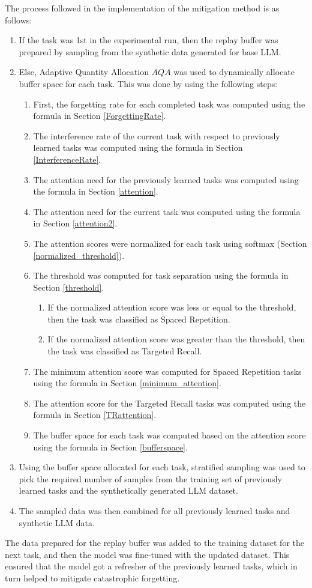 The process followed in the implementation of the mitigation method is as follows:
\begin{enumerate}
\item If the task was 1st in the experimental run, then the replay buffer was prepared by sampling from the synthetic data generated for base LLM.
\item Else, Adaptive Quantity Allocation \(AQA\) was used to dynamically allocate buffer space for each task. This was done by using the following steps:
\begin{enumerate} [label*=\arabic*.]
\item First, the forgetting rate for each completed task was computed using the formula in Section \ref{ForgettingRate}.
\item The interference rate of the current task with respect to previously learned tasks was computed using the formula in Section \ref{InterferenceRate}.
\item The attention need for the previously learned tasks was computed using the formula in Section \ref{attention}.
\item The attention need for the current task was computed using the formula in Section \ref{attention2}.
\item The attention scores were normalized for each task using softmax (Section \ref{normalized_threshold}).
\item The threshold was computed for task separation using the formula in Section \ref{threshold}.
\begin{enumerate} [label*=\roman*.]
\item If the normalized attention score was less or equal to the threshold, then the task was classified as Spaced Repetition.
\item If the normalized attention score was greater than the threshold, then the task was classified as Targeted Recall.
\end{enumerate}
\item The minimum attention score was computed for Spaced Repetition tasks using the formula in Section \ref{minimum_attention}.
\item The attention score for the Targeted Recall tasks was computed using the formula in Section \ref{TRattention}.
\item The buffer space for each task was computed based on the attention score using the formula in Section \ref{bufferspace}.
\end{enumerate}
\item Using the buffer space allocated for each task, stratified sampling was used to pick the required number of samples from the training set of previously learned tasks and the synthetically generated LLM dataset.
\item The sampled data was then combined for all previously learned tasks and synthetic LLM data.
\end{enumerate}

The data prepared for the replay buffer was added to the training dataset for the next task, and then the model was fine-tuned with the updated dataset. This ensured that the model got a refresher of the previously learned tasks, which in turn helped to mitigate catastrophic forgetting.